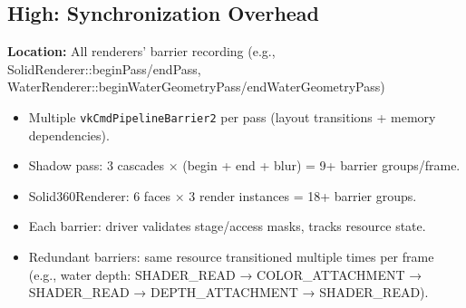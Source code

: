 \documentclass[11pt,a4paper]{article}
\begin{document}
\subsection{High: Synchronization Overhead}
\textbf{Location:} All renderers' barrier recording (e.g., SolidRenderer::beginPass/endPass, WaterRenderer::beginWaterGeometryPass/endWaterGeometryPass)

\begin{itemize}
    \item Multiple \texttt{vkCmdPipelineBarrier2} per pass (layout transitions + memory dependencies).
    \item Shadow pass: 3 cascades × (begin + end + blur) = 9+ barrier groups/frame.
    \item Solid360Renderer: 6 faces × 3 render instances = 18+ barrier groups.
    \item Each barrier: driver validates stage/access masks, tracks resource state.
    \item Redundant barriers: same resource transitioned multiple times per frame (e.g., water depth: SHADER\_READ → COLOR\_ATTACHMENT → SHADER\_READ → DEPTH\_ATTACHMENT → SHADER\_READ).
\end{itemize}
\end{document}
